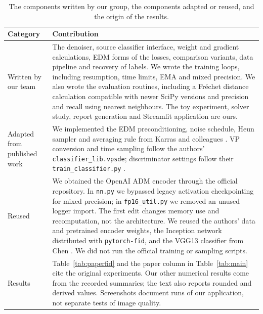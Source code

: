 \documentclass[11pt,a4paper]{article}
\makeatletter
\renewcommand\subsection{\@startsection{subsection}{2}{\z@}{1.5ex plus .2ex}{.4ex}{\normalfont\large\bfseries\color{Accent}\raggedright}}
\makeatother
\begin{document}
\subsection{Who contributed what}\label{sec:attrib}
\begin{table}[H]\centering
\caption[Attribution of code and results]{The components written by our group, the components adapted or reused, and the origin of the results.}\label{tab:attrib}
\small\begin{tabularx}{\linewidth}{@{}P{32mm}Y@{}}\toprule
Category & Contribution\\\midrule
Written by our team & The denoiser, source classifier interface, weight and gradient calculations, EDM forms of the losses, comparison variants, data pipeline and recovery of labels. We wrote the training loops, including resumption, time limits, EMA and mixed precision. We also wrote the evaluation routines, including a Fréchet distance calculation compatible with newer SciPy versions and precision and recall using nearest neighbours. The toy experiment, solver study, report generation and Streamlit application are ours.\\
Adapted from published work & We implemented the EDM preconditioning, noise schedule, Heun sampler and averaging rule from Karras and colleagues \cite{karras2022edm}. VP conversion and time sampling follow the authors' \texttt{classifier\_lib.vpsde}; discriminator settings follow their \texttt{train\_classifier.py} \cite{tiwdsmcode}.\\
Reused & We obtained the OpenAI ADM encoder through the official repository. In \texttt{nn.py} we bypassed legacy activation checkpointing for mixed precision; in \texttt{fp16\_util.py} we removed an unused logger import. The first edit changes memory use and recomputation, not the architecture. We reused the authors' data and pretrained encoder weights, the Inception network distributed with \texttt{pytorch-fid}, and the VGG13 classifier from Chen \cite{chenyaofo2021cifar}. We did not run the official training or sampling scripts.\\
Results & Table~\ref{tab:paperfid} and the paper column in Table~\ref{tab:main} cite the original experiments. Our other numerical results come from the recorded summaries; the text also reports rounded and derived values. Screenshots document runs of our application, not separate tests of image quality.\\\bottomrule
\end{tabularx}
\end{table}
\end{document}

